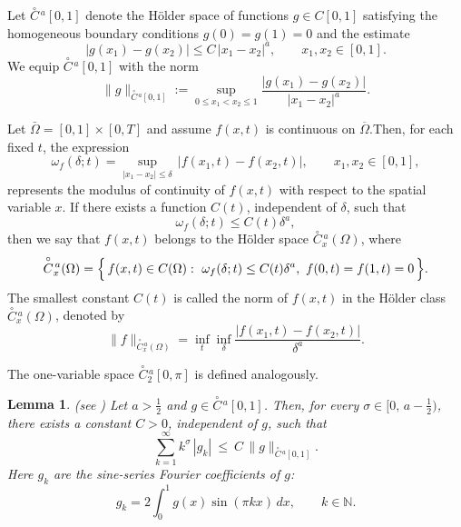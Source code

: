 \documentclass{amsart}
\numberwithin{equation}{section}
\newtheorem{lem}[thm]{Lemma}
\begin{document}
Let $\overset{\circ}{C}{}^{\,a}[0,1]$  denote the H\"older space of functions $g\in C[0,1]$
satisfying the homogeneous boundary conditions $g(0)=g(1)=0$ and the estimate
\begin{equation*}
|g(x_1)-g(x_2)|\le C\,|x_1-x_2|^{a},\qquad x_1,x_2\in[0,1].
\end{equation*}
We equip $\overset{\circ}{C}{}^{\,a}[0,1]$ with the norm
\begin{equation*}
\|g\|_{\overset{\circ}{C}{}^{\,a}[0,1]}
:=\sup_{0\le x_1<x_2\le1}\frac{|g(x_1)-g(x_2)|}{|x_1-x_2|^{a}}.
\end{equation*}

Let $\bar{\Omega}=[0,1]\times[0,T]$ and assume $f(x,t)$ is continuous on $\overline{\Omega}$.Then, for each
fixed $t$, the expression
\begin{equation*}
\omega_f(\delta;t)=\sup_{|x_1-x_2|\le \delta}\,|f(x_1,t)-f(x_2,t)|,\qquad x_1,x_2\in[0,1],
\end{equation*}
represents the modulus of continuity of $f(x,t)$ with respect to the spatial variable $x$. If there exists a
function $C(t)$, independent of $\delta$, such that
\begin{equation*}
\omega_f(\delta;t)\le C(t)\delta^{a},
\end{equation*}
then we say that $f(x,t)$ belongs to the H\"older space $\overset{\circ}{C}{}^{\,a}_x(\Omega)$, where
\begin{equation*}
\overset{\circ}{C}{}^{\,a}_x(\Omega)=\Bigl\{\,f(x,t)\in C(\Omega):\ \omega_f(\delta;t)\le C(t)\delta^{a},\
f(0,t)=f(1,t)=0\,\Bigr\}.
\end{equation*}
The smallest constant $C(t)$ is called the norm of $f(x,t)$ in the H\"older class
$\overset{\circ}{C}{}^{\,a}_x(\Omega)$, denoted by
\begin{equation*}
\|f\|_{\overset{\circ}{C}{}^{\,a}_x(\Omega)}
=\inf_{t}\inf_{\delta}\frac{|f(x_1,t)-f(x_2,t)|}{\delta^{a}}.
\end{equation*}

The one-variable space $\overset{\circ}{C}{}^{\,a}_2[0,\pi]$ is defined analogously.

\begin{lem}(see \cite{jumaeva:ref:22})
Let $a>\frac12$ and $g\in \overset{\circ}{C}{}^{\,a}[0,1]$.
Then, for every $\sigma\in\big[0,\,a-\frac12\big)$, there exists a constant $C>0$,
independent of $g$, such that
\begin{equation*}
\sum_{k=1}^{\infty} k^{\sigma}\,|g_k|\ \le\ C\,\|g\|_{\overset{\circ}{C}{}^{\,a}[0,1]}.
\end{equation*}
Here $g_k$ are the sine-series Fourier coefficients of $g$:
\begin{equation*}
g_k=2\int_{0}^{1} g(x)\sin(\pi kx)\,dx,\qquad k\in\mathbb{N}.
\end{equation*} \label{jumaeva:lem:1}
\end{lem}
\end{document}
